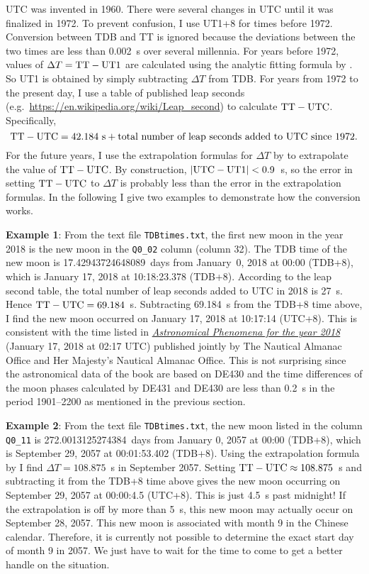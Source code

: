 \documentclass[12pt]{article}
\newcommand \beq {\begin{equation}}
\newcommand \eeq {\end{equation}}
\begin{document}
\begin{CJK}{UTF8}{bkai}
UTC was invented in 1960. There were several changes in UTC until it was 
finalized in 1972. To prevent confusion, I use 
UT1+8 for times before 1972. Conversion between TDB and TT is ignored 
because the deviations between the two times are less than 0.002~s 
over several millennia. For years before 1972, values of 
$\Delta T ={\rm TT-UT1}$ are 
calculated using the analytic fitting formula by \cite{deltaT}.
So UT1 is obtained by simply subtracting $\Delta T$ from TDB. 
For years from 1972 to the present day, I use a table of published leap seconds 
(e.g.\ \href{https://en.wikipedia.org/wiki/Leap_second}
{https://en.wikipedia.org/wiki/Leap\_second}) to calculate ${\rm TT-UTC}$. 
Specifically, 
\beq
  {\rm TT-UTC} = 42.184~{\rm s} + 
\mbox{total number of leap seconds added to UTC since 1972} .
\eeq
For the future years, I use the extrapolation formulas for $\Delta T$ by \cite{deltaT}
to extrapolate the value of ${\rm TT-UTC}$. By construction, $|{\rm UTC-UT1}|<0.9$~s, 
so the error in setting ${\rm TT-UTC}$ to $\Delta T$ is probably less than 
the error in the extrapolation formulas. In the following I give two examples 
to demonstrate how the conversion works. 

{\bf Example 1}: From the text file {\tt TDBtimes.txt}, the 
first new moon in the year 2018 is the new moon in the {\tt Q0\_02} column (column 32). 
The TDB time of the new moon is 17.42943724648089~days from January~0, 2018 at 00:00 
(TDB+8), which is January 17, 2018 at 10:18:23.378 (TDB+8). According to the leap 
second table, the total number of leap seconds added to UTC in 2018 is 27~s. Hence 
${\rm TT-UTC} = 69.184$~s. Subtracting 69.184~s from the TDB+8 time above, 
I find the new moon occurred on January 17, 2018 at 10:17:14 
(UTC+8). This is consistent with the time listed in 
\href{http://aa.usno.navy.mil/publications/reports/ap18_for_web.pdf}{\it Astronomical 
Phenomena for the year 2018} (January 17, 2018 at 02:17 UTC) published jointly by 
The Nautical Almanac Office 
and Her Majesty's Nautical Almanac Office. This is not surprising since the 
astronomical data of the book are based on DE430 and the time differences of the 
moon phases 
calculated by DE431 and DE430 are less than 0.2~s in the period 1901--2200 as 
mentioned in the previous section.

{\bf Example 2}: From the text file {\tt TDBtimes.txt}, the new moon listed 
in the column {\tt Q0\_11} is 272.0013125274384~days from January 0, 2057 at 
00:00 (TDB+8), which is September 29, 2057 at 00:01:53.402 (TDB+8). 
Using the extrapolation formula by \cite{deltaT}
I find $\Delta T = 108.875$~s in September 2057. Setting 
${\rm TT-UTC}\approx 108.875$~s and subtracting it from the TDB+8 time above
gives the new moon occurring on September 29, 2057 at 00:00:4.5 (UTC+8). 
This is just 4.5~s past midnight! If the extrapolation is off by more than 5~s, 
this new moon may actually occur on September 28, 2057. This new moon is 
associated with month 9 in the Chinese calendar. Therefore, it is currently 
not possible to determine the exact start day of month 9 in 2057. We just 
have to wait for the time to come to get a better handle on the situation.


\end{CJK}
\end{document}
